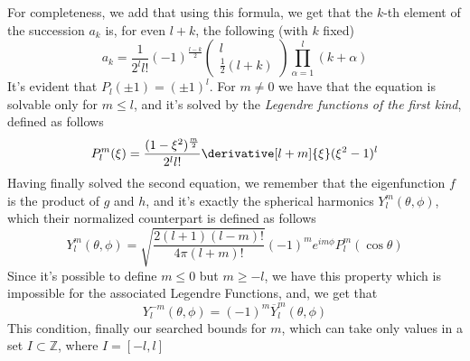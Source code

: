 \documentclass[a4paper, 11pt]{book}
\newcommand{\1}{\opr{\mathds{1}}}
\newcommand{\cc}[1]{\overline{#1}}
\theoremstyle{plain}
\begin{document}
	For completeness, we add that using this formula, we get that the $k$-th element of the succession $a_k$ is, for even $l+k$, the following (with $k$ fixed)
	\begin{equation*}
		a_k=\frac{1}{2^ll!}(-1)^{\frac{l-k}{2}}\begin{pmatrix}l\\\frac{1}{2}(l+k)\end{pmatrix}\prod_{\alpha=1}^l(k+\alpha)
	\end{equation*}
	It's evident that $P_l(\pm1)=(\pm1)^l$. For $m\ne0$ we have that the equation is solvable only for $m\le l$, and it's solved by the \textit{Legendre functions of the first kind}, defined as follows
	\begin{equation}
		P_l^m(\xi)=\frac{(1-\xi^2)^{\frac{m}{2}}}{2^ll!}\derivative[l+m]{\xi}(\xi^2-1)^l
		\label{eq:generallegendre}
	\end{equation}
	Having finally solved the second equation, we remember that the eigenfunction $f$ is the product of $g$ and $h$, and it's exactly the spherical harmonics $Y^m_l(\theta,\phi)$, which their normalized counterpart is defined as follows
	\begin{equation}
		Y^m_l(\theta,\phi)=\sqrt{\frac{2(l+1)(l-m)!}{4\pi(l+m)!}}(-1)^me^{im\phi}P^m_l(\cos\theta)
		\label{eq:sphharmcomp}
	\end{equation}
	Since it's possible to define $m\le0$ but $m\ge-l$, we have this property which is impossible for the associated Legendre Functions, and, we get that
	\begin{equation}
		Y^{-m}_l(\theta,\phi)=(-1)^m\cc{Y}^m_l(\theta,\phi)
		\label{eq:minusmsphharm}
	\end{equation}
	This condition, finally our searched bounds for $m$, which can take only values in a set $I\subset\mathbb{Z}$, where $I=[-l,l]$
\end{document}
